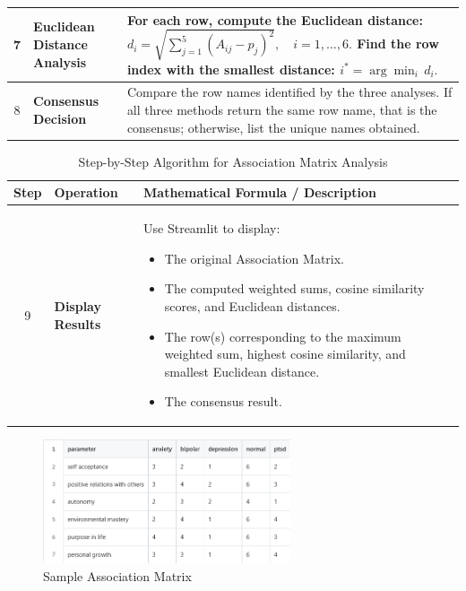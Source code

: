 \begin{table}[H]
\begin{tabularx}{\textwidth}{|c|p{6cm}|>{\raggedright\arraybackslash}X|}
    7 & \textbf{Euclidean Distance Analysis} & For each row, compute the Euclidean distance:
    \( \displaystyle d_i = \sqrt{\sum_{j=1}^{5} \left(A_{ij} - p_j\right)^2}, \quad i=1,\dots,6. \)
    Find the row index with the smallest distance:
    \( \displaystyle i^* = \arg\min_{i}\, d_i. \) \newline \\ \hline
    8 & \textbf{Consensus Decision} & Compare the row names identified by the three analyses. If all three methods return the same row name, that is the consensus; otherwise, list the unique names obtained. \\ \hline
\end{tabularx}
\end{table}

\begin{table}[H]
    \centering
    \caption*{Step-by-Step Algorithm for Association Matrix Analysis}
    \label{tab:algorithm}
    \begin{tabularx}{\textwidth}{|c|p{6cm}|>{\raggedright\arraybackslash}X|}
    \hline
    \textbf{Step} & \textbf{Operation} & \textbf{Mathematical Formula / Description} \\ \hline
    9 & \textbf{Display Results} & Use Streamlit to display:
    \begin{itemize}[noitemsep, topsep=0pt]
        \item The original Association Matrix.
        \item The computed weighted sums, cosine similarity scores, and Euclidean distances.
        \item The row(s) corresponding to the maximum weighted sum, highest cosine similarity, and smallest Euclidean distance.
        \item The consensus result.
    \end{itemize} \\ \hline
    \end{tabularx}
\end{table}

\begin{figure}[h!]  
    \centering
    \includegraphics[width=0.65\textwidth]{App Images/33 Interface.png}  
    \caption{Sample Association Matrix}
    \label{01i}  %
\end{figure}

